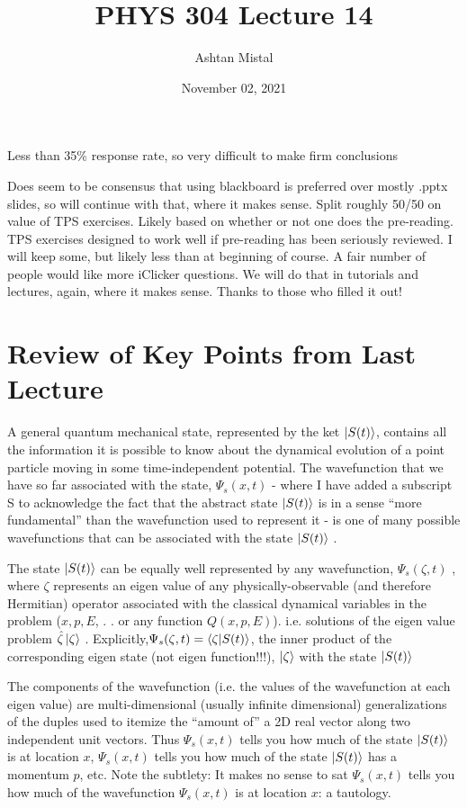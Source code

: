 \documentclass{article}
\title{PHYS 304 Lecture 14}
\author{Ashtan Mistal}
\date{November 02, 2021}
\begin{document}
\ifstandalone
\maketitle
\fi

\graphicspath{{./Lecture14/}}

Less than 35\% response rate, so very difficult to make firm conclusions

Does seem to be consensus that using blackboard is preferred over mostly .pptx slides, so will continue with that, where it makes sense. Split roughly 50/50 on value of TPS exercises. Likely based on whether or not one does the pre-reading. TPS exercises designed to work well if pre-reading has been seriously reviewed. I will keep some, but likely less than at beginning of course. A fair number of people would like more iClicker questions. We will do that in tutorials and lectures, again, where it makes sense. Thanks to those who filled it out!


\section{Review of Key Points from Last Lecture}

A general quantum mechanical state, represented by the ket $\ket{S(t)}$, contains all the information it is possible to know about the dynamical evolution of a point particle moving in some time-independent potential. The wavefunction that we have so far associated with the state, $\Psi_s(x,t)$ - where I have added a subscript S to acknowledge the fact that the abstract state $\ket{S(t)}$ is in a sense “more fundamental” than the wavefunction used to represent it - is one of many possible wavefunctions that can be associated with the state $\ket{S(t)}$ .

The state $\ket{S(t)}$ can be equally well represented by any wavefunction, $\Psi_s(\zeta, t)$ , where $\zeta$ represents an eigen value of any physically-observable (and therefore Hermitian) operator associated with the classical dynamical variables in the problem ($x,p,E$, . . or any function $Q(x,p,E)$). i.e. solutions of the eigen value problem $\hat{\zeta} \ket{\zeta}$ . Explicitly,$\Psi_s(\zeta, t) = \braket{\zeta|S(t)}$, the inner product of the corresponding eigen state (not eigen function!!!), $\ket{\zeta}$ with the state  $\ket{S(t)}$


The components of the wavefunction (i.e. the values of the wavefunction at each eigen value) are multi-dimensional (usually infinite dimensional) generalizations of the duples used to itemize the “amount of” a 2D real vector along two independent unit vectors. Thus $\Psi_s(x,t)$ tells you how much of the state $\ket{S(t)}$ is at location $x$, $\Psi_s(x,t)$ tells you how much of the state $\ket{S(t)}$ has a momentum $p$, etc. Note the subtlety: It makes no sense to sat $\Psi_s(x,t)$ tells you how much of the wavefunction $\Psi_s(x,t)$ is at location $x$: a tautology. 
\end{document}
